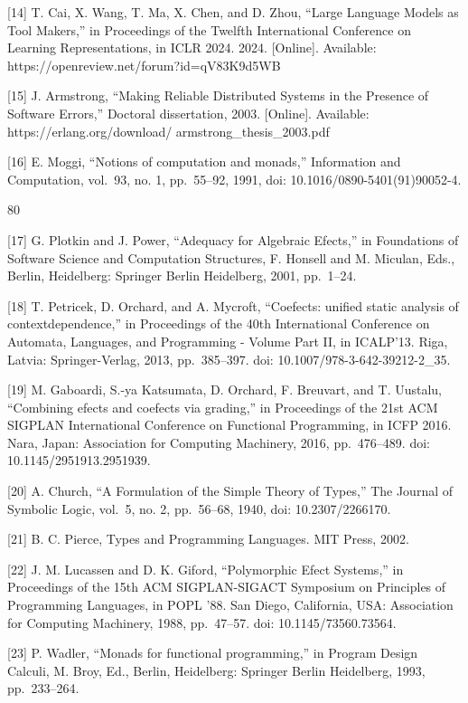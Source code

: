 \documentclass[
  10
]{article}
\begin{document}
{[}14{]} T. Cai, X. Wang, T. Ma, X. Chen, and D. Zhou, ``Large Language
Models as Tool Makers,'' in Proceedings of the Twelfth International
Conference on Learning Representations, in ICLR 2024. 2024.
{[}Online{]}. Available: https://openreview.net/forum?id=qV83K9d5WB

{[}15{]} J. Armstrong, ``Making Reliable Distributed Systems in the
Presence of Software Errors,'' Doctoral dissertation, 2003.
{[}Online{]}. Available: https://erlang.org/download/
armstrong\_thesis\_2003.pdf

{[}16{]} E. Moggi, ``Notions of computation and monads,'' Information
and Computation, vol.~93, no. 1, pp.~55--92, 1991, doi:
10.1016/0890-5401(91)90052-4.

80

{[}17{]} G. Plotkin and J. Power, ``Adequacy for Algebraic Efects,'' in
Foundations of Software Science and Computation Structures, F. Honsell
and M. Miculan, Eds., Berlin, Heidelberg: Springer Berlin Heidelberg,
2001, pp.~1--24.

{[}18{]} T. Petricek, D. Orchard, and A. Mycroft, ``Coefects: unified
static analysis of contextdependence,'' in Proceedings of the 40th
International Conference on Automata, Languages, and Programming -
Volume Part II, in ICALP'13. Riga, Latvia: Springer-Verlag, 2013,
pp.~385--397. doi: 10.1007/978-3-642-39212-2\_35.

{[}19{]} M. Gaboardi, S.-ya Katsumata, D. Orchard, F. Breuvart, and T.
Uustalu, ``Combining efects and coefects via grading,'' in Proceedings
of the 21st ACM SIGPLAN International Conference on Functional
Programming, in ICFP 2016. Nara, Japan: Association for Computing
Machinery, 2016, pp.~476--489. doi: 10.1145/2951913.2951939.

{[}20{]} A. Church, ``A Formulation of the Simple Theory of Types,'' The
Journal of Symbolic Logic, vol.~5, no. 2, pp.~56--68, 1940, doi:
10.2307/2266170.

{[}21{]} B. C. Pierce, Types and Programming Languages. MIT Press, 2002.

{[}22{]} J. M. Lucassen and D. K. Giford, ``Polymorphic Efect Systems,''
in Proceedings of the 15th ACM SIGPLAN-SIGACT Symposium on Principles of
Programming Languages, in POPL '88. San Diego, California, USA:
Association for Computing Machinery, 1988, pp.~47--57. doi:
10.1145/73560.73564.

{[}23{]} P. Wadler, ``Monads for functional programming,'' in Program
Design Calculi, M. Broy, Ed., Berlin, Heidelberg: Springer Berlin
Heidelberg, 1993, pp.~233--264.
\end{document}
